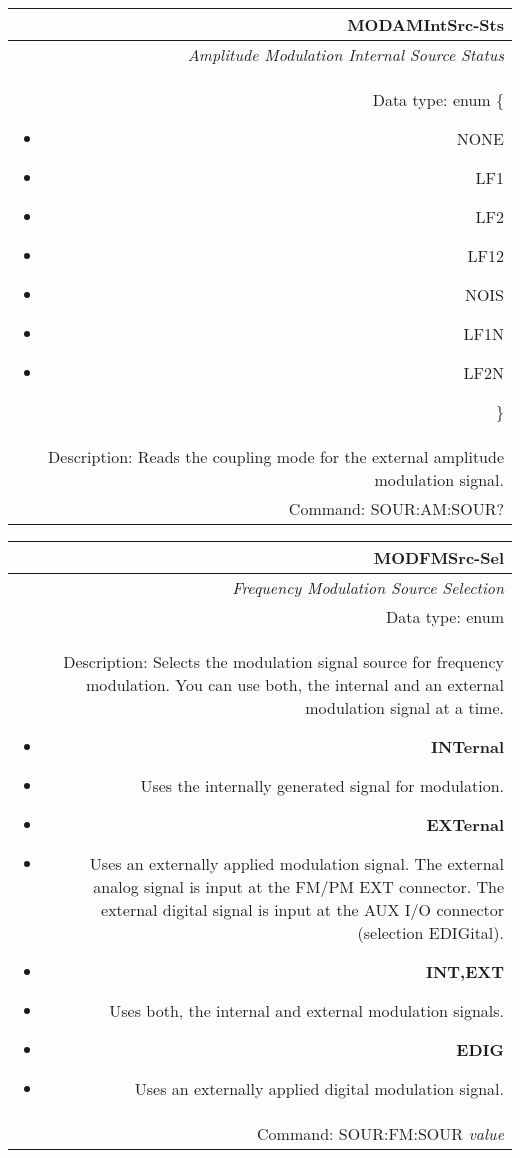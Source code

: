 \documentclass[openany]{article}
\begin{document}
		\begin{tabular}{N}
			\hline
			\bfseries MODAMIntSrc-Sts \\ \hline
			\emph{Amplitude Modulation Internal Source Status} \\
			Data type: enum \{\begin{itemize}[noitemsep]
				\small
				\item[] NONE
				\item[] LF1
				\item[] LF2
				\item[] LF12
				\item[] NOIS
				\item[] LF1N
				\item[] LF2N
			\end{itemize}\} \\ 
			Description: Reads the coupling mode for the external amplitude modulation signal. \\
			Command: SOUR:AM:SOUR? \\

		\end{tabular}
%
		\begin{tabular}{N}
			\hline
			\bfseries MODFMSrc-Sel \\ \hline
			\emph{Frequency Modulation Source Selection} \\
			Data type: enum \\  
			Description: Selects the modulation signal source for frequency modulation. You can use both, the internal and an external modulation signal at a time.\begin{itemize}[noitemsep]
				\small
				\item[] \textbf{INTernal}
				\item[] Uses the internally generated signal for modulation.
				\item[] \textbf{EXTernal}
				\item[]	Uses an externally applied modulation signal. The external analog signal is input at the FM/PM EXT connector. The external digital signal is input at the AUX I/O connector (selection EDIGital).
				\item[] \textbf{INT,EXT} 
				\item[]	Uses both, the internal and external modulation signals.
				\item[] \textbf{EDIG} 
				\item[]	Uses an externally applied digital modulation signal.
			\end{itemize} \\
			Command: SOUR:FM:SOUR \emph{value} \\

		\end{tabular}
\end{document}
